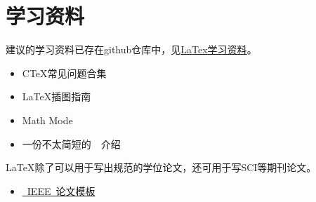\chapter{学习资料}
\label{chap:material}

建议的学习资料已存在github仓库中，见\href{https://github.com/BIT-thesis/LaTex-template/tree/master/LaTex%E5%AD%A6%E4%B9%A0%E8%B5%84%E6%96%99}{LaTex学习资料}。

\begin{itemize}
\item C\TeX 常见问题合集
\item \LaTeX 插图指南
\item Math Mode
\item 一份不太简短的~\LaTeXe{}~介绍

\end{itemize}

\LaTeX 除了可以用于写出规范的学位论文，还可用于写SCI等期刊论文。

\begin{itemize}
\item \href{http://www.ctan.org/tex-archive/macros/latex/contrib/IEEEtran/}{~IEEE~论文模板}

\end{itemize}